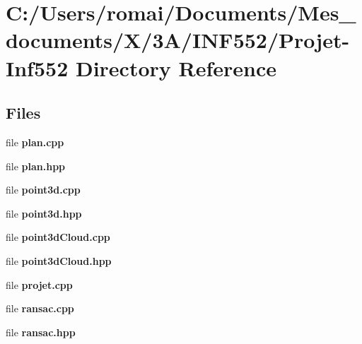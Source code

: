 \section{C\+:/\+Users/romai/\+Documents/\+Mes\+\_\+documents/\+X/3\+A/\+I\+N\+F552/\+Projet-\/\+Inf552 Directory Reference}
\label{dir_108e36830bfc99ba8c0670ce3e37cc94}
\subsection*{Files}
\begin{DoxyCompactItemize}
\item 
file \textbf{ plan.\+cpp}
\item 
file \textbf{ plan.\+hpp}
\item 
file \textbf{ point3d.\+cpp}
\item 
file \textbf{ point3d.\+hpp}
\item 
file \textbf{ point3d\+Cloud.\+cpp}
\item 
file \textbf{ point3d\+Cloud.\+hpp}
\item 
file \textbf{ projet.\+cpp}
\item 
file \textbf{ ransac.\+cpp}
\item 
file \textbf{ ransac.\+hpp}
\end{DoxyCompactItemize}
